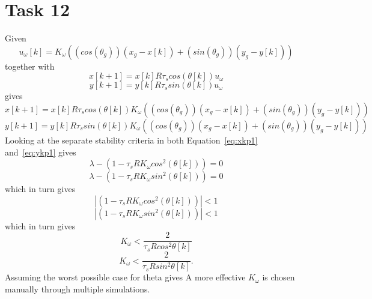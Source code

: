 \documentclass[a4paper,12pt,oneside,onecolumn]{article} %
\begin{document}
\section*{Task 12}
 	Given
	\begin{equation}
		u_\omega[k]= K_\omega((cos(\theta_g))(x_g-x[k]) + (sin(\theta_g))(y_g-y[k]))
	\end{equation}
	together with
	\begin{equation}
		x[k+1] = x[k]R\tau_scos(\theta[k])u_\omega
	\end{equation}
	\begin{equation}
		y[k+1] = y[k]R\tau_ssin(\theta[k])u_\omega
	\end{equation}
	gives
	\begin{equation}
		x[k+1] = x[k]R\tau_scos(\theta[k])K_\omega((cos(\theta_g))(x_g-x[k]) + (sin(\theta_g))(y_g-y[k]))
		 \label{eq:xkp1}
	\end{equation}
	\begin{equation}
		y[k+1] = y[k]R\tau_ssin(\theta[k])K_\omega((cos(\theta_g))(x_g-x[k]) + (sin(\theta_g))(y_g-y[k]))
		 \label{eq:ykp1}
	\end{equation}
	Looking at the separate stability criteria in both Equation~\ref{eq:xkp1} and~\ref{eq:ykp1} gives
	\begin{equation}
		\lambda-(1-\tau_sRK_{\omega}cos^2(\theta[k])) = 0
	\end{equation}
	\begin{equation}
		\lambda-(1-\tau_sRK_{\omega}sin^2(\theta[k])) = 0
	\end{equation}
	which in turn gives
	\begin{equation}
		\left| (1-\tau_sRK_{\omega}cos^2(\theta[k])) \right | < 1
	\end{equation}
	\begin{equation}
		\left| (1-\tau_sRK_{\omega}sin^2(\theta[k])) \right | < 1
	\end{equation}
	which in turn gives
	\begin{equation}
		K_\omega < \frac{2}{\tau_sRcos^2\theta[k]}
	\end{equation}
	\begin{equation}
		K_\omega < \frac{2}{\tau_sRsin^2\theta[k]}.
	\end{equation}
  	Assuming the worst possible case for theta gives
	A more effective $K_\omega$ is chosen manually through multiple simulations.
\end{document}
